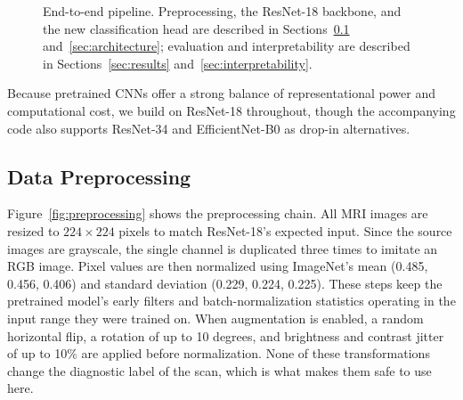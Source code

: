 \documentclass[twocolumn]{article}
\begin{document}
\begin{figure}[t]
\centering
{}
\caption{End-to-end pipeline. Preprocessing, the ResNet-18 backbone, and the new classification head are described in Sections~\ref{sec:preprocessing} and~\ref{sec:architecture}; evaluation and interpretability are described in Sections~\ref{sec:results} and~\ref{sec:interpretability}.}
\label{fig:pipeline}
\end{figure}

Because pretrained CNNs offer a strong balance of representational power and computational cost, we build on ResNet-18 \citep{he2016deep} throughout, though the accompanying code also supports ResNet-34 and EfficientNet-B0 as drop-in alternatives.

\subsection{Data Preprocessing}
\label{sec:preprocessing}
Figure~\ref{fig:preprocessing} shows the preprocessing chain. All MRI images are resized to $224 \times 224$ pixels to match ResNet-18's expected input. Since the source images are grayscale, the single channel is duplicated three times to imitate an RGB image. Pixel values are then normalized using ImageNet's mean (0.485, 0.456, 0.406) and standard deviation (0.229, 0.224, 0.225). These steps keep the pretrained model's early filters and batch-normalization statistics operating in the input range they were trained on. When augmentation is enabled, a random horizontal flip, a rotation of up to 10 degrees, and brightness and contrast jitter of up to 10\% are applied before normalization. None of these transformations change the diagnostic label of the scan, which is what makes them safe to use here.
\end{document}
